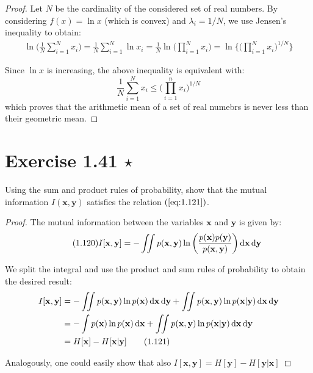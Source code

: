 \begin{proof}
    Let $N$ be the cardinality of the considered set of real numbers. By considering
    $f(x) = \ln x$ (which is convex) and  $\lambda_i = 1/N$, we use Jensen's inequality
    to obtain:
    \begin{align*}
        \ln \bigg(\frac{1}{N} \sum_{i=1}^{N} x_i\bigg) 
        = \frac{1}{N} \sum_{i=1}^{N} \ln x_i
        = \frac{1}{N} \ln \bigg(\prod_{i = 1}^N x_i\bigg)
        = \ln \bigg\{\bigg(\prod_{i = 1}^N x_i\bigg)^{1/N}\bigg\}
    \end{align*}

    Since $\ln x$ is increasing, the above inequality is equivalent with:
     \[
         \frac{1}{N} \sum_{i=1}^{N} x_i \leq \bigg({\prod_{i = 1}^n x_i}\bigg)^{1/N}
    \] 
    which proves that the arithmetic mean of a set of real numebrs
    is never less than their geometric mean.
\end{proof}

\section*{Exercise 1.41 $\star$}
Using the sum and product rules of probability, show that the mutual
information $I(\mathbf{x}, \mathbf{y})$ satisfies the relation  $(\ref{eq:1.121})$.

\vspace{1em}

\begin{proof}
    The mutual information between the variables $\mathbf{x}$ and $\mathbf{y}$ is
    given by:
    \begin{equation}\label{eq:1.120}\tag{1.120}
        I[\mathbf{x}, \mathbf{y}] 
        = -\iint p(\mathbf{x}, \mathbf{y}) \ln \bigg(\frac{p(\mathbf{x})p(\mathbf{y})}
        {p(\mathbf{x}, \mathbf{y})}\bigg) \mathop{}\!\mathrm{d} \mathbf{x} \mathop{}\!\mathrm{d} \mathbf{y}
    \end{equation}

    We split the integral and use the product and sum rules of probability to obtain
    the desired result:
    \begin{align*}
        I[\mathbf{x}, \mathbf{y}] 
        &= -\iint p(\mathbf{x}, \mathbf{y}) \ln p(\mathbf{x}) \mathop{}\!\mathrm{d} \mathbf{x} \mathop{}\!\mathrm{d} \mathbf{y}
        + \iint p(\mathbf{x}, \mathbf{y}) \ln p(\mathbf{x} | \mathbf{y}) \mathop{}\!\mathrm{d} \mathbf{x} \mathop{}\!\mathrm{d} \mathbf{y} \\
        &= -\int p(\mathbf{x}) \ln p(\mathbf{x}) \mathop{}\!\mathrm{d} \mathbf{x} 
        + \iint p(\mathbf{x}, \mathbf{y}) \ln p(\mathbf{x} | \mathbf{y}) \mathop{}\!\mathrm{d} \mathbf{x} \mathop{}\!\mathrm{d} \mathbf{y} \\
        &= H[\mathbf{x}] - H[\mathbf{x} | \mathbf{y}] \label{eq:1.121}\tag{1.121}
    \end{align*}

    Analogously, one could easily show that also
    $I[\mathbf{x}, \mathbf{y}] = H[\mathbf{y}] - H[\mathbf{y} | \mathbf{x}]$
\end{proof}
